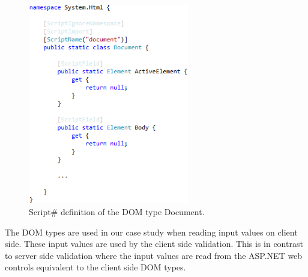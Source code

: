 		\begin{figure}[H]
				\includegraphics[width=7cm]{resources/images/Document.png}
			\caption{Script\# definition of the DOM type Document.}
			\label{fig:document}
		\end{figure}

		The DOM types are used in our case study when reading input values on client side. These input values are used by the client side validation. This is in contrast to server side validation where the input values are read from the ASP.NET web controls equivalent to the client side DOM types.


\FloatBarrier